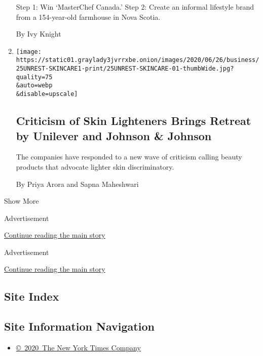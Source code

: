 \begin{enumerate}
  Step 1: Win `MasterChef Canada.' Step 2: Create an informal lifestyle
  brand from a 154-year-old farmhouse in Nova Scotia.

  By Ivy Knight
\item
  \href{/2020/06/25/business/unilever-jj-skin-care-lightening.html}{}

  \texttt{[image: https://static01.graylady3jvrrxbe.onion/images/2020/06/26/business/25UNREST-SKINCARE1-print/25UNREST-SKINCARE-01-thumbWide.jpg?quality=75\\\&auto=webp\\\&disable=upscale]}

  \hypertarget{criticism-of-skin-lighteners-brings-retreat-by-unilever-and-johnson--johnson}{%
  \subsection{Criticism of Skin Lighteners Brings Retreat by Unilever
  and Johnson \&
  Johnson}\label{criticism-of-skin-lighteners-brings-retreat-by-unilever-and-johnson--johnson}}

  The companies have responded to a new wave of criticism calling beauty
  products that advocate lighter skin discriminatory.

  By Priya Arora and Sapna Maheshwari
\end{enumerate}

Show More

Advertisement

\protect\hyperlink{after-mid8}{Continue reading the main story}

Advertisement

\protect\hyperlink{after-mktg}{Continue reading the main story}

\hypertarget{site-index}{%
\subsection{Site Index}\label{site-index}}

\hypertarget{site-information-navigation}{%
\subsection{Site Information
Navigation}\label{site-information-navigation}}

\begin{itemize}
\tightlist
\item
  \href{https://help.nytimes3xbfgragh.onion/hc/en-us/articles/115014792127-Copyright-notice}{©~2020~The
  New York Times Company}
\end{itemize}

